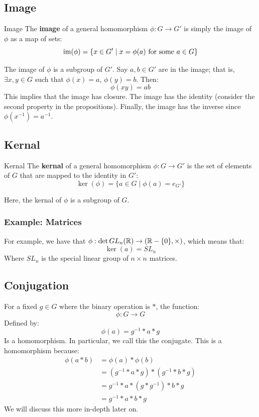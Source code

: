 \documentclass[letterpaper]{article}
\begin{document}
\subsection{Image}
\begin{definition}{Image}{}
    The \textbf{image} of a general homomorphism $\phi: G \to G'$ is simply the image of $\phi$ as a map of sets: 
    \[\operatorname{im}(\phi) = \{x \in G' \mid x = \phi(a) \text{ for some } a \in G\}\]
\end{definition}
The image of $\phi$ is a subgroup of $G'$. Say $a, b \in G'$ are in the image; that is, $\exists x, y \in G$ such that $\phi(x) = a$, $\phi(y) = b$. Then: 
\[\phi(xy) = ab\]
This implies that the image has closure. The image has the identity (consider the second property in the propositions). Finally, the image has the inverse since $\phi(x^{-1}) = a^{-1}$. 

\subsection{Kernal}
\begin{definition}{Kernal}{}
    The \textbf{kernal} of a general homomorphism $\phi: G \to G'$ is the set of elements of $G$ that are mapped to the identity in $G'$: 
    \[\ker(\phi) = \{a \in G \mid \phi(a) = e_{G'}\}\]
\end{definition}
Here, the kernal of $\phi$ is a subgroup of $G$. 


\subsubsection{Example: Matrices}
For example, we have that $\phi: \det GL_n (\mathbb{R}) \to (\mathbb{R} - \{0\}, \times)$, which means that: 
\[\ker(a) = SL_n\]
Where $SL_n$ is the special linear group of $n \times n$ matrices. 

\subsection{Conjugation}
For a fixed $g \in G$ where the binary operation is $*$, the function: 
\[\phi: G \to G\]
Defined by: 
\[\phi(a) = g^{-1} * a * g\]
Is a homomorphism. In particular, we call this the conjugate. This is a homomorphism because: 
\begin{equation*}
    \begin{aligned}
        \phi(a * b) &= \phi(a) * \phi(b) \\ 
            &= (g^{-1} * a * g) * (g^{-1} * b * g) \\ 
            &= g^{-1} * a * (g * g^{-1}) * b * g \\ 
            &= g^{-1} * a * b * g
    \end{aligned}
\end{equation*}
We will discuss this more in-depth later on. 
\end{document}
